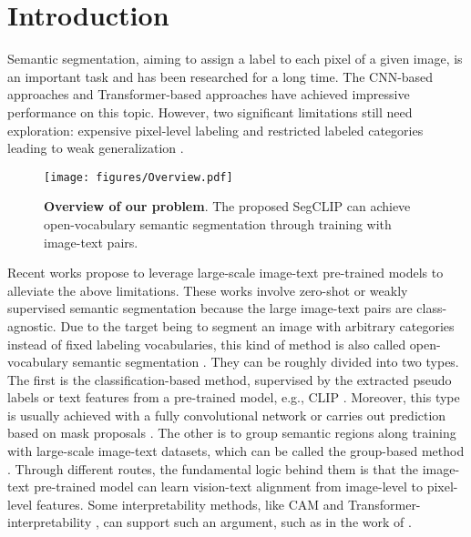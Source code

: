 \documentclass{article}
\theoremstyle{plain}
\theoremstyle{definition}
\theoremstyle{remark}
\begin{document}
\section{Introduction}
\label{sec_introduction}

Semantic segmentation, aiming to assign a label to each pixel of a given image, is an important task and has been researched for a long time. The CNN-based approaches \cite{Long2015FCN, Ronneberger2015UNet, Chen2015Semantic, Zhao2017Pyramid, Deeplabv3plus2018, Wen2022SlotCon} and Transformer-based approaches \cite{Cheng2021Per, Zheng2021SETR, Xie2021SegFormer, Cheng2021mask2former, Jain2022OneFormer} have achieved impressive performance on this topic. However, two significant limitations still need exploration: expensive pixel-level labeling and restricted labeled categories leading to weak generalization \cite{Bucher2019Zero, Xian2019Semantic}. 
\begin{figure}[tp]
    \centering
    \texttt{[image: figures/Overview.pdf]}
    \caption{\textbf{Overview of our problem}. The proposed SegCLIP can achieve open-vocabulary semantic segmentation through training with image-text pairs.}
    \label{fig:overview}
\end{figure}

Recent works propose to leverage large-scale image-text pre-trained models to alleviate the above limitations. These works involve zero-shot or weakly supervised semantic segmentation because the large image-text pairs are class-agnostic. Due to the target being to segment an image with arbitrary categories instead of fixed labeling vocabularies, this kind of method is also called open-vocabulary semantic segmentation \cite{Ghiasi2021Scaling,Xu2021A,Liang2022Open,Ma2022Open}. They can be roughly divided into two types. The first is the classification-based method, supervised by the extracted pseudo labels or text features from a pre-trained model, e.g., CLIP \cite{Radford2021Learning}. Moreover, this type is usually achieved with a fully convolutional network or carries out prediction based on mask proposals \cite{zhou2022maskclip,Xu2021A}. The other is to group semantic regions along training with large-scale image-text datasets, which can be called the group-based method \cite{Xu2022GroupViT}. Through different routes, the fundamental logic behind them is that the image-text pre-trained model can learn vision-text alignment from image-level to pixel-level features. Some interpretability methods, like CAM \cite{selvaraju2017grad} and Transformer-interpretability \cite{chefer2021transformer}, can support such an argument, such as in the work of \cite{Zabari2021Semantic}.
\end{document}
